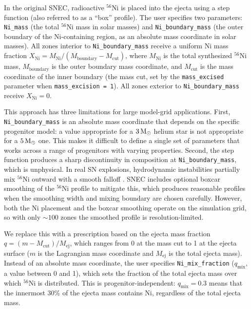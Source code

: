 \documentclass[twocolumn,linenumbers]{aastex701}
\begin{document}
In the original SNEC, radioactive $^{56}$Ni is placed into the ejecta using a step function (also referred to as a ``box'' profile). The user specifies two parameters: \texttt{Ni\_mass} (the total $^{56}$Ni mass in solar masses) and \texttt{Ni\_boundary\_\-mass} (the outer boundary of the Ni-containing region, as an absolute mass coordinate in solar masses). All zones interior to \texttt{Ni\_boundary\_\-mass} receive a uniform Ni mass fraction $X_{\mathrm{Ni}} = M_{\mathrm{Ni}} / (M_{\mathrm{boundary}} - M_{\mathrm{cut}})$, where $M_{\mathrm{Ni}}$ is the total synthesized $^{56}$Ni mass, $M_{\mathrm{boundary}}$ is the outer boundary mass coordinate, and $M_{\mathrm{cut}}$ is the mass coordinate of the inner boundary (the mass cut, set by the \texttt{mass\_excised} parameter when \texttt{mass\_excision\,=\,1}). All zones exterior to \texttt{Ni\_boundary\_\-mass} receive $X_{\mathrm{Ni}} = 0$.

This approach has three limitations for large model-grid applications. First, \texttt{Ni\_boundary\_\-mass} is an absolute mass coordinate that depends on the specific progenitor model: a value appropriate for a $3\,{\rm M}_\odot$ helium star is not appropriate for a $5\,{\rm M}_\odot$ one. This makes it difficult to define a single set of parameters that works across a range of progenitors with varying properties. Second, the step function produces a sharp discontinuity in composition at \texttt{Ni\_boundary\_\-mass}, which is unphysical. In real SN explosions, hydrodynamic instabilities partially mix $^{56}$Ni outward with a smooth falloff \citep{Kifonidis2003}. SNEC includes optional boxcar smoothing of the $^{56}$Ni profile to mitigate this, which produces reasonable profiles when the smoothing width and mixing boundary are chosen carefully. However, both the Ni placement and the boxcar smoothing operate on the simulation grid, so with only $\sim100$ zones the smoothed profile is resolution-limited.

We replace this with a prescription based on the ejecta mass fraction $q = (m - M_{\mathrm{cut}}) / M_{\mathrm{ej}}$, which ranges from 0 at the mass cut to 1 at the ejecta surface ($m$ is the Lagrangian mass coordinate and $M_{\mathrm{ej}}$ is the total ejecta mass). Instead of an absolute mass coordinate, the user specifies \texttt{Ni\_mix\_\-fraction} ($q_{\mathrm{mix}}$, a value between 0 and 1), which sets the fraction of the total ejecta mass over which $^{56}$Ni is distributed. This is progenitor-independent: $q_{\mathrm{mix}} = 0.3$ means that the innermost 30\% of the ejecta mass contains Ni, regardless of the total ejecta mass.
\end{document}
